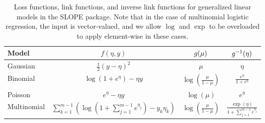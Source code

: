 \documentclass[article]{jss}
\begin{document}
\begin{table}[t!]
  \centering
  \begin{tabular}{lccc}
    \toprule
    Model       & \(f(\eta, y)\)                                                                                       & \(g(\mu)\)                            & \(g^{-1}(\eta)\)                                       \\
    \midrule
    Gaussian    & \(\frac{1}{2}(y - \eta)^2\)                                                                          & \(\mu\)                                   & \(\eta\)                                               \\
    \addlinespace
    Binomial    & \(\log(1 + e^\eta) - \eta y\)                                                                        & \(\log \left(\frac{\mu}{1 - \mu}\right)\) & \(\frac{e^\eta}{1 + e^\eta}\)                          \\
    \addlinespace
    Poisson     & \(e^\eta - \eta y\)                                                                                  & \(\log(\mu)\)                             & \(e^\eta\)                                             \\
    \addlinespace
    Multinomial & \(\sum_{k=1}^{m-1}\left( \log \left( 1 +  \sum_{j=1}^{m-1} e^{\eta_j}\right) - y_k \eta_k  \right)\) & \(\log\left(\frac{\mu}{1 - \mu}\right) \) & \(\frac{\exp(\eta)}{1 + \sum_{j=1}^{m-1} e^{\eta_j}}\) \\
    \bottomrule
  \end{tabular}
  \caption{Loss functions, link functions, and inverse link functions for
    generalized linear models in the SLOPE package. Note that in the case of
    multinomial logistic regression, the input is vector-valued, and we allow
    \(\log\) and \(\exp\) to be overloaded to apply element-wise in these cases.
  }
  \label{tab:glm}
\end{table}
\end{document}
